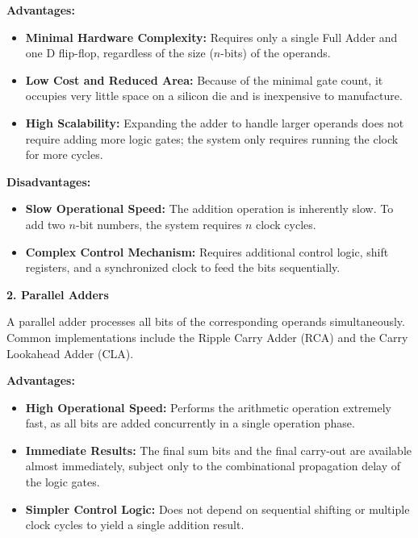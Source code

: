 \documentclass[12pt,a3paper]{article}
\begin{document}
\begin{enumerate}
\begin{tcolorbox}[enhanced,breakable,ansbox,colback=cD!4,colframe=cD,boxrule=0.8pt,arc=5pt,title={\textbf{Answer}},fonttitle=\bfseries\color{white},colbacktitle=cD]
\textbf{Advantages:}
\begin{itemize}
    \item \textbf{Minimal Hardware Complexity:} Requires only a single Full Adder and one D flip-flop, regardless of the size ($n$-bits) of the operands.
    \item \textbf{Low Cost and Reduced Area:} Because of the minimal gate count, it occupies very little space on a silicon die and is inexpensive to manufacture.
    \item \textbf{High Scalability:} Expanding the adder to handle larger operands does not require adding more logic gates; the system only requires running the clock for more cycles.
\end{itemize}

\textbf{Disadvantages:}
\begin{itemize}
    \item \textbf{Slow Operational Speed:} The addition operation is inherently slow. To add two $n$-bit numbers, the system requires $n$ clock cycles.
    \item \textbf{Complex Control Mechanism:} Requires additional control logic, shift registers, and a synchronized clock to feed the bits sequentially.
\end{itemize}

\vspace{1em}
\textbf{\textcolor{cD}{2. Parallel Adders}}

A parallel adder processes all bits of the corresponding operands simultaneously. Common implementations include the Ripple Carry Adder (RCA) and the Carry Lookahead Adder (CLA).

\textbf{Advantages:}
\begin{itemize}
    \item \textbf{High Operational Speed:} Performs the arithmetic operation extremely fast, as all bits are added concurrently in a single operation phase.
    \item \textbf{Immediate Results:} The final sum bits and the final carry-out are available almost immediately, subject only to the combinational propagation delay of the logic gates.
    \item \textbf{Simpler Control Logic:} Does not depend on sequential shifting or multiple clock cycles to yield a single addition result.
\end{itemize}


\end{tcolorbox}
\end{enumerate}
\end{document}
